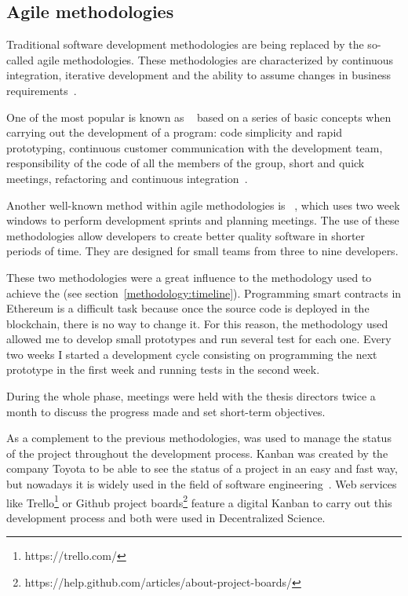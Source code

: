 \subsection{Agile methodologies}
\label{sec:agile-methodologies}

Traditional software development methodologies are being replaced by the
so-called agile methodologies. These methodologies are characterized by
continuous integration, iterative development and the ability to assume changes
in business requirements~\cite{boehm2005management,livermore2008factors}.

One of the most popular is known as ~\cite{lindstrom2004extreme} based on a series of basic concepts
when carrying out the development of a program: code simplicity and rapid
prototyping, continuous customer communication with the development team,
responsibility of the code of all the members of the group, short and quick
meetings, refactoring and continuous integration~\cite{theunissen2005search}.

Another well-known method within agile methodologies is
~\cite{rising2000scrum}, which uses two week windows to perform
development sprints and planning meetings. The use of these methodologies allow
developers to create better quality software in shorter periods of time. They
are designed for small teams from three to nine developers.

These two methodologies were a great influence to the methodology used to
achieve the  (see
section~\ref{methodology:timeline}). Programming smart contracts in Ethereum is
a difficult task because once the source code is deployed in the blockchain,
there is no way to change it. For this reason, the methodology used allowed me to
develop small prototypes and run several test for each one. Every two weeks I
started a development cycle consisting on programming the next prototype in the
first week and running tests in the second week.

During the whole  phase, meetings were held with the
thesis directors twice a month to discuss the progress made and set short-term
objectives.

As a complement to the previous methodologies,  was used to manage
the status of the project throughout the development process. Kanban was created
by the company Toyota to be able to see the status of a project in an easy and
fast way, but nowadays it is widely used in the field of software
engineering~\cite{ahmad2013kanban}. Web services like
Trello\footnote{https://trello.com/} or Github project
boards\footnote{https://help.github.com/articles/about-project-boards/} feature
a digital Kanban to carry out this development process and both were used in
Decentralized Science.

